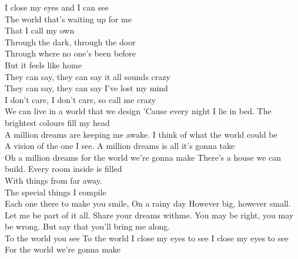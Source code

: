 \ve{}
I close my eyes and I can see\\
The world that's waiting up for me\\
That I call my own\\
Through the dark, through the door\\
Through where no one's been before\\
But it feels like home\\
They can say, they can say it all sounds crazy\\
They can say, they can say I've lost my mind\\
I don't care, I don't care, so call me crazy\\
We can live in a world that we design
\cho{}
'Cause every night I lie in bed.
The brightest colours fill my head\\
A million dreams are keeping me awake.
I think of what the world could be\\
A vision of the one I see.
A million dreams is all it's gonna take\\
Oh a million dreams for the world we're gonna make
\ve{}
There's a house we can build.
Every room inside is filled\\
With things from far away.\\
The special things I compile\\
Each one there to make you smile,
On a rainy day
\ve{}
However big, however small.\\
Let me be part of it all.
Share your dreams withme.
You may be right, you may be wrong.
But say that you'll bring me along.\\
To the world you see
To the world I close my eyes to see
I close my eyes to see
\cho{}
For the world we're gonna make
\esong{}
